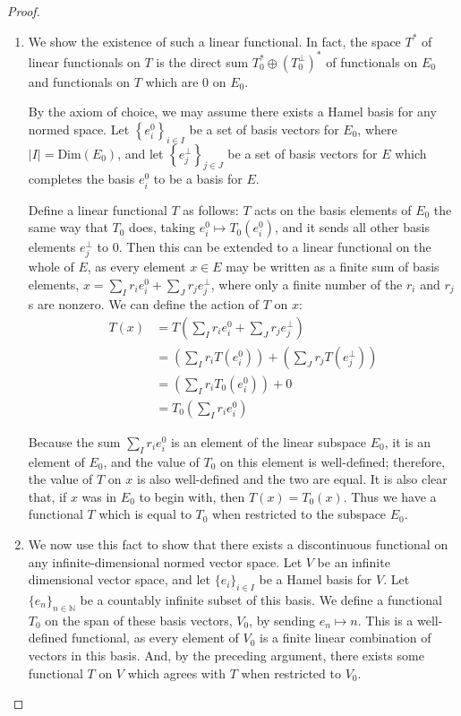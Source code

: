\documentclass[12pt]{article}
\newcommand{\N}{\mathbb{N}}
\theoremstyle{definition}
\begin{document}
\begin{proof}
	\begin{enumerate}[label=(\roman*)]
		\item We show the existence of such a linear functional. In fact, the space $T^*$ of linear functionals on $T$ is the direct sum $T_0^* \oplus (T_0^\perp)^*$ of functionals on $E_0$ and functionals on $T$ which are $0$ on $E_0$.
		\par By the axiom of choice, we may assume there exists a Hamel basis for any normed space. Let $\left\{ e_i^0 \right\}_{i \in I}$ be a set of basis vectors for $E_0$, where $\left \lvert { I } \right \lvert = \text{Dim}(E_0)$, and let $\left\{ e_j^\perp \right\}_{j \in J}$ be a set of basis vectors for $E$ which completes the basis $e_i^0$ to be a basis for $E$.
		\par Define a linear functional $T$ as follows: $T$ acts on the basis elements of $E_0$ the same way that $T_0$ does, taking $e_i^0 \mapsto T_0(e_i^0)$, and it sends all other basis elements $e_j^\perp$ to $0$. Then this can be extended to a linear functional on the whole of $E$, as every element $x \in E$ may be written as a finite sum of basis elements, $x = \sum_I r_i e_i^0 + \sum_J r_j e_j^\perp$, where only a finite number of the $r_i$ and $r_j$s are nonzero. We can define the action of $T$ on $x$:
		\begin{align*}
			T(x) &= T \left( \sum_{I}r_ie_i^0 + \sum_{J}r_je_j^\perp \right)\\
			&= (\sum_{I} r_iT(e_i^0)) + \left( \sum_{J}r_jT(e_j^\perp) \right)\\
			&= (\sum_{I}r_i T_0(e_i^0)) + 0\\
			&= T_0(\sum_{I}r_ie_i^0)
		\end{align*}
		\par Because the sum $\sum_{I} r_i e_i^0$ is an element of the linear subspace $E_0$, it is an element of $E_0$, and the value of $T_0$ on this element is well-defined; therefore, the value of $T$ on $x$ is also well-defined and the two are equal. It is also clear that, if $x$ was in $E_0$ to begin with, then $T(x) = T_0(x)$. Thus we have a functional $T$ which is equal to $T_0$ when restricted to the subspace $E_0$.
	\item We now use this fact to show that there exists a discontinuous functional on any infinite-dimensional normed vector space. Let $V$ be an infinite dimensional vector space, and let $\{e_i\}_{i \in I}$ be a Hamel basis for $V$. Let $\{e_n\}_{n \in \N}$ be a countably infinite subset of this basis. We define a functional $T_0$ on the span of these basis vectors, $V_0$, by sending $e_n \mapsto n$. This is a well-defined functional, as every element of $V_0$ is a finite linear combination of vectors in this basis. And, by the preceding argument, there exists some functional $T$ on $V$ which agrees with $T$ when restricted to $V_0$. 

\end{enumerate}
\end{proof}
\end{document}

